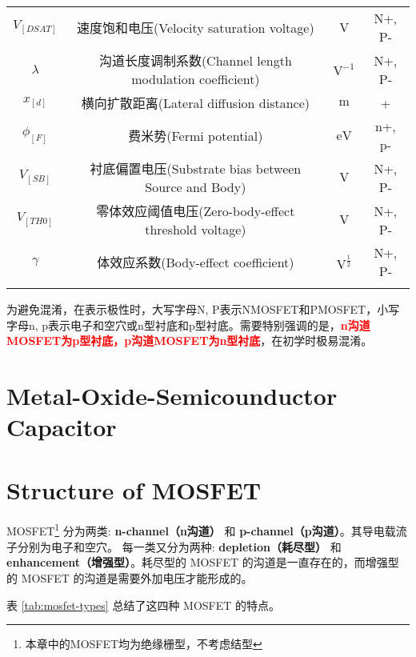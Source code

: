 \begin{table}[!htb]
\begin{NiceTabular}{cccc}
        $V_[DSAT]$ & 速度饱和电压(Velocity saturation voltage) & $\unit{\volt}$ & N+, P- \\
        $\lambda$ & 沟道长度调制系数(Channel length modulation coefficient) & $\unit{\volt \tothe{-1}}$ & N+, P- \\
        $x_[d]$ & 横向扩散距离(Lateral diffusion distance) & $\unit{\meter}$ & + \\
        $\phi_[F]$ & 费米势(Fermi potential) & $\unit{\eV}$ & n+, p- \\
        $V_[SB]$ & 衬底偏置电压(Substrate bias between Source and Body) & $\unit{\volt}$ & N+, P- \\
        $V_[TH0]$ & 零体效应阈值电压(Zero-body-effect threshold voltage) & $\unit{\volt}$ & N+, P- \\
        $\gamma$ & 体效应系数(Body-effect coefficient) & $\unit{\volt\tothe{\frac{1}{2}}}$ & N+, P-\\
        \Xhline{1pt}
    \end{NiceTabular}
    \begin{tablenotes}
        \item 为避免混淆，在表示极性时，大写字母N, P表示NMOSFET和PMOSFET，小写字母n, p表示电子和空穴或n型衬底和p型衬底。需要特别强调的是，\textcolor{red}{\textbf{n沟道MOSFET为p型衬底，p沟道MOSFET为n型衬底}}，在初学时极易混淆。
    \end{tablenotes}
\end{table}

\section[MOS]{Metal-Oxide-Semicounductor Capacitor}

\section{Structure of MOSFET}

MOSFET\footnote{本章中的MOSFET均为绝缘栅型，不考虑结型} 分为两类: \textbf{n-channel（n沟道）} 和 \textbf{p-channel（p沟道）}。其导电载流子分别为电子和空穴。
每一类又分为两种: \textbf{depletion（耗尽型）} 和 \textbf{enhancement（增强型）}。耗尽型的 MOSFET 的沟道是一直存在的，而增强型的 MOSFET 的沟道是需要外加电压才能形成的。

表 \ref{tab:mosfet-types} 总结了这四种 MOSFET 的特点。

